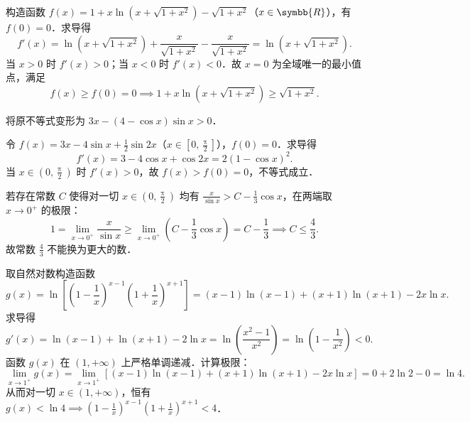 \begin{myproof}

    构造函数 $f(x) = 1 + x\ln(x+\sqrt{1+x^2}) - \sqrt{1+x^2}$（$x \in \symbb{R}$），有 $f(0) = 0$．求导得
    \begin{equation}
        f'(x) = \ln(x+\sqrt{1+x^2}) + \frac{x}{\sqrt{1+x^2}} - \frac{x}{\sqrt{1+x^2}} = \ln(x+\sqrt{1+x^2}).
    \end{equation}
    当 $x > 0$ 时 $f'(x) > 0$；当 $x < 0$ 时 $f'(x) < 0$．故 $x = 0$ 为全域唯一的最小值点，满足
    \begin{equation}
        f(x) \geqslant f(0) = 0 \implies 1 + x\ln(x+\sqrt{1+x^2}) \geqslant \sqrt{1+x^2}.
    \end{equation}


    将原不等式变形为 $3x - (4 - \cos x)\sin x > 0$．

    令 $f(x) = 3x - 4\sin x + \frac{1}{2}\sin 2x$（$x \in \left[0, \frac{\uppi}{2}\right]$），$f(0) = 0$．求导得
    \begin{equation}
        f'(x) = 3 - 4\cos x + \cos 2x = 2(1 - \cos x)^2.
    \end{equation}
    当 $x \in \left(0, \frac{\uppi}{2}\right)$ 时 $f'(x) > 0$，故 $f(x) > f(0) = 0$，不等式成立．

    若存在常数 $C$ 使得对一切 $x \in \left(0, \frac{\uppi}{2}\right)$ 均有 $\frac{x}{\sin x} > C - \frac{1}{3}\cos x$，在两端取 $x \to 0^+$ 的极限：
    \begin{equation}
        1 = \lim_{x\to 0^+} \frac{x}{\sin x} \geqslant \lim_{x\to 0^+} \left( C - \frac{1}{3}\cos x \right) = C - \frac{1}{3} \implies C \leqslant \frac{4}{3}.
    \end{equation}
    故常数 $\frac{4}{3}$ 不能换为更大的数．


    取自然对数构造函数
    \begin{equation}
        g(x) = \ln\left[ \left(1 - \frac{1}{x}\right)^{x-1}\left(1 + \frac{1}{x}\right)^{x+1} \right] = (x-1)\ln(x-1) + (x+1)\ln(x+1) - 2x\ln x.
    \end{equation}
    求导得
    \begin{equation}
        g'(x) = \ln(x-1) + \ln(x+1) - 2\ln x = \ln\left( \frac{x^2-1}{x^2} \right) = \ln\left( 1 - \frac{1}{x^2} \right) < 0.
    \end{equation}
    函数 $g(x)$ 在 $(1, +\infty)$ 上严格单调递减．计算极限：
    \begin{equation}
        \lim_{x\to 1^+} g(x) = \lim_{x\to 1^+} \left[ (x-1)\ln(x-1) + (x+1)\ln(x+1) - 2x\ln x \right] = 0 + 2\ln 2 - 0 = \ln 4.
    \end{equation}
    从而对一切 $x \in (1, +\infty)$，恒有 $g(x) < \ln 4 \implies \left(1 - \frac{1}{x}\right)^{x-1}\left(1 + \frac{1}{x}\right)^{x+1} < 4$．


\end{myproof}
